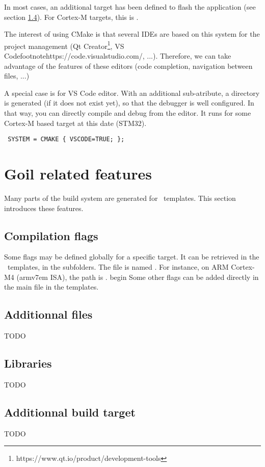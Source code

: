 In most cases, an additional target has been defined to flash the application (see section \ref{sec:additionnalTarget}). For Cortex-M targets, this is .


The interest of using CMake is that several IDEs are based on this system for the project management (Qt Creator{\footnote{https://www.qt.io/product/development-tools}}, VS Code{footnote{https://code.visualstudio.com/}}, ...). Therefore, we can take advantage of the features of these editors (code completion, navigation between files, ...)

A special case is for VS Code editor. With an additional sub-atribute, a  directory is generated (if it does not exist yet), so that the debugger is well configured. In that way, you can directly compile and debug from the editor.
It runs for some Cortex-M based target at this date (STM32).
\lstset{language=OIL}
\begin{lstlisting}
 SYSTEM = CMAKE { VSCODE=TRUE; };
\end{lstlisting}

\section{Goil related features}

Many parts of the build system are generated for \goil\ templates. This section introduces these features.

\subsection{Compilation flags}

Some flags may be defined globally for a specific target. It can be retrieved in the \goil\ templates, in the  subfolders. The file is named . For instance, on ARM Cortex-M4 (armv7em ISA), the path is .
begin
Some other flags can be added directly in the main  file in the templates.

\subsection{Additionnal files}
TODO

\subsection{Libraries}
TODO

\subsection{Additionnal build target}
\label{sec:additionnalTarget}
TODO
